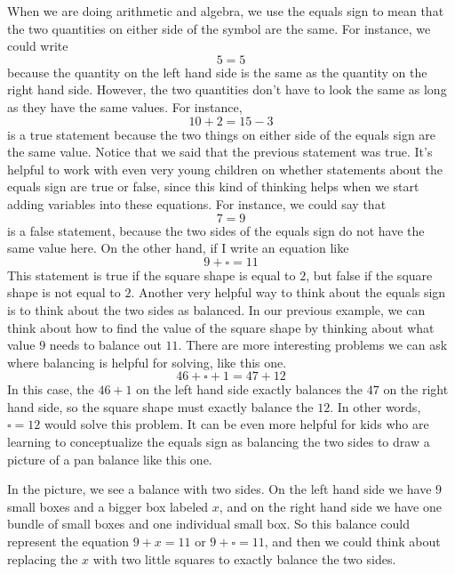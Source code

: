 \documentclass{ximera}
\begin{document}
When we are doing arithmetic and algebra, we use the equals sign to mean that the two quantities on either side of the symbol are the same. For instance, we could write
\[
5 = 5
\]
because the quantity on the left hand side is the same as the quantity on the right hand side. However, the two quantities don't have to look the same as long as they have the same values. For instance, 
\[
10 + 2 = 15 - 3
\]
is a true statement because the two things on either side of the equals sign are the same value. Notice that we said that the previous statement was true. It's helpful to work with even very young children on whether statements about the equals sign are true or false, since this kind of thinking helps when we start adding variables into these equations. For instance, we could say that 
\[
7 = 9
\]
is a false statement, because the two sides of the equals sign do not have the same value here. On the other hand, if I write an equation like
\[
9 + \square = 11
\]
This statement is true if the square shape is equal to $2$, but false if the square shape is not equal to $2$. Another very helpful way to think about the equals sign is to think about the two sides as balanced. In our previous example, we can think about how to find the value of the square shape by thinking about what value $9$ needs to balance out $11$. There are more interesting problems we can ask where balancing is helpful for solving, like this one.
\[
46 + \square + 1 = 47 + 12 
\]
In this case, the $46 + 1$ on the left hand side exactly balances the $47$ on the right hand side, so the square shape must exactly balance the $12$. In other words, $\square = 12$ would solve this problem. It can be even more helpful for kids who are learning to conceptualize the equals sign as balancing the two sides to draw a picture of a pan balance like this one.
\begin{image}
\end{image}
In the picture, we see a balance with two sides. On the left hand side we have $9$ small boxes and a bigger box labeled $x$, and on the right hand side we have one bundle of small boxes and one individual small box. So this balance could represent the equation $9 + x = 11$ or $9 + \square = 11$, and then we could think about replacing the $x$ with two little squares to exactly balance the two sides.
\end{document}
